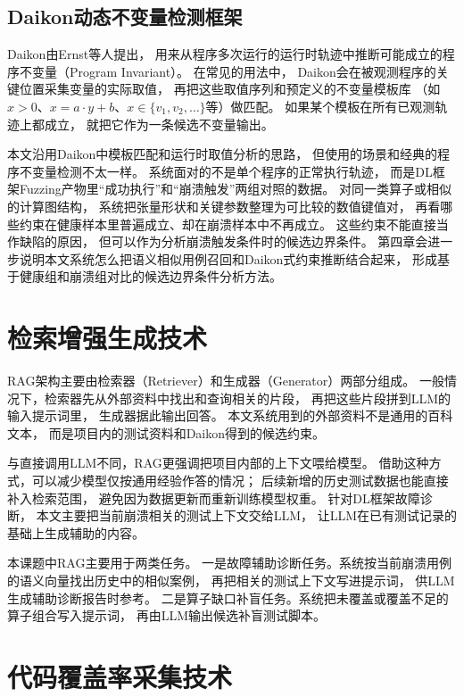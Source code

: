 \subsection{Daikon动态不变量检测框架}

Daikon\cite{ref_daikon}由Ernst等人提出，
用来从程序多次运行的运行时轨迹中推断可能成立的程序不变量（Program Invariant）。
在常见的用法中，
Daikon会在被观测程序的关键位置采集变量的实际取值，
再把这些取值序列和预定义的不变量模板库
（如$x > 0$、$x = a \cdot y + b$、$x \in \{v_1, v_2, \ldots\}$等）做匹配。
如果某个模板在所有已观测轨迹上都成立，
就把它作为一条候选不变量输出。

本文沿用Daikon中模板匹配和运行时取值分析的思路，
但使用的场景和经典的程序不变量检测不太一样。
系统面对的不是单个程序的正常执行轨迹，
而是DL框架Fuzzing产物里“成功执行”和“崩溃触发”两组对照的数据。
对同一类算子或相似的计算图结构，
系统把张量形状和关键参数整理为可比较的数值键值对，
再看哪些约束在健康样本里普遍成立、却在崩溃样本中不再成立。
这些约束不能直接当作缺陷的原因，
但可以作为分析崩溃触发条件时的候选边界条件。
第四章会进一步说明本文系统怎么把语义相似用例召回和Daikon式约束推断结合起来，
形成基于健康组和崩溃组对比的候选边界条件分析方法。

\section{检索增强生成技术}

RAG架构\cite{ref_rag_survey}主要由检索器（Retriever）和生成器（Generator）两部分组成。
一般情况下，检索器先从外部资料中找出和查询相关的片段，
再把这些片段拼到LLM的输入提示词里，
生成器据此输出回答。
本文系统用到的外部资料不是通用的百科文本，
而是项目内的测试资料和Daikon得到的候选约束。

与直接调用LLM不同，RAG更强调把项目内部的上下文喂给模型。
借助这种方式，可以减少模型仅按通用经验作答的情况；
后续新增的历史测试数据也能直接补入检索范围，
避免因为数据更新而重新训练模型权重\cite{ref_rag_knowledge}。
针对DL框架故障诊断，
本文主要把当前崩溃相关的测试上下文交给LLM，
让LLM在已有测试记录的基础上生成辅助的内容。

本课题中RAG主要用于两类任务。
一是故障辅助诊断任务。系统按当前崩溃用例的语义向量找出历史中的相似案例，
再把相关的测试上下文写进提示词，
供LLM生成辅助诊断报告时参考。
二是算子缺口补盲任务。系统把未覆盖或覆盖不足的算子组合写入提示词，
再由LLM输出候选补盲测试脚本。

\section{代码覆盖率采集技术}

